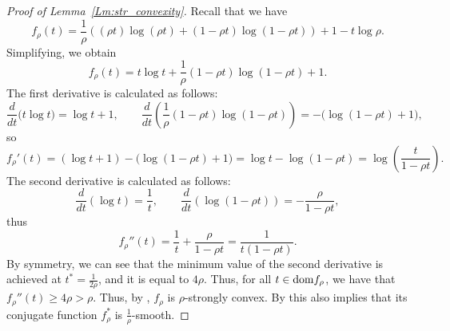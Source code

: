 \documentclass{article}
\theoremstyle{plain}
\theoremstyle{definition}
\theoremstyle{remark}
\begin{document}
 {
\begin{proof}[Proof of Lemma~\ref{Lm:str_convexity}]
Recall that we have
\[
f_\rho(t)
= \frac{1}{\rho}\!\left((\rho t)\log(\rho t) + (1-\rho t)\log(1-\rho t)\right)
+ 1 - t\log\rho .
\]
Simplifying, we obtain
\[
f_\rho(t)
= t\log t + \frac{1}{\rho}(1-\rho t)\log(1-\rho t) + 1.
\]
{The first derivative is calculated as follows:}
\[
\frac{d}{dt}\big(t\log t\big)
= \log t + 1,
\qquad
\frac{d}{dt}\!\left(\frac{1}{\rho}(1-\rho t)\log(1-\rho t)\right)
= -\big(\log(1-\rho t) + 1\big),
\]
so
\[
f_\rho'(t)
= (\log t + 1) - \big(\log(1-\rho t) + 1\big)
= \log t - \log(1-\rho t)
= \log\!\left(\frac{t}{1-\rho t}\right).
\]
{The second derivative is calculated as follows:}
\[
\frac{d}{dt}\!\left(\log t\right) = \frac{1}{t},
\qquad
\frac{d}{dt}\!\left(\log(1-\rho t)\right)
= -\frac{\rho}{1-\rho t},
\]
thus
\[
f_\rho''(t)
= \frac{1}{t} + \frac{\rho}{1-\rho t}
= \frac{1}{t(1-\rho t)}.
\]
By symmetry, we can see that the minimum value of the second derivative is achieved at $t^*=\frac{1}{2\rho}$, and it is equal to $4\rho$. Thus, for all $t\in {\rm dom} f_\rho$, we have that $f_\rho''(t)\geq 4\rho >\rho$. Thus, by \citep[Theorem 2.1.11]{nesterov2018lectures}, $f_\rho$ is $\rho$-strongly convex. By \citep[Theorem 1]{Zhou2018FenchelDuality} this also implies that its conjugate function $f_\rho^*$ is $\frac{1}{\rho}$-smooth.
\end{proof}
}
\end{document}
